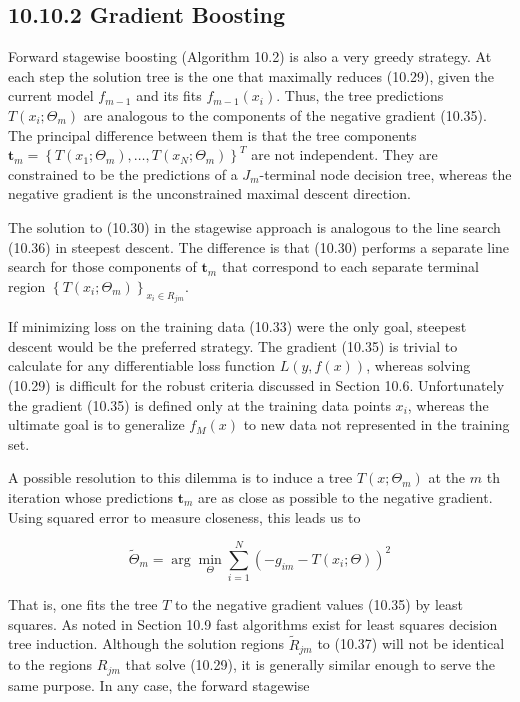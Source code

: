 \documentclass[10pt]{article}
\begin{document}
\subsection*{10.10.2 Gradient Boosting}
Forward stagewise boosting (Algorithm 10.2) is also a very greedy strategy. At each step the solution tree is the one that maximally reduces (10.29), given the current model $f_{m-1}$ and its fits $f_{m-1}\left(x_{i}\right)$. Thus, the tree predictions $T\left(x_{i} ; \Theta_{m}\right)$ are analogous to the components of the negative gradient (10.35). The principal difference between them is that the tree components $\mathbf{t}_{m}=\left\{T\left(x_{1} ; \Theta_{m}\right), \ldots, T\left(x_{N} ; \Theta_{m}\right)\right\}^{T}$ are not independent. They are constrained to be the predictions of a $J_{m}$-terminal node decision tree, whereas the negative gradient is the unconstrained maximal descent direction.

The solution to (10.30) in the stagewise approach is analogous to the line search (10.36) in steepest descent. The difference is that (10.30) performs a separate line search for those components of $\mathbf{t}_{m}$ that correspond to each separate terminal region $\left\{T\left(x_{i} ; \Theta_{m}\right)\right\}_{x_{i} \in R_{j m}}$.

If minimizing loss on the training data (10.33) were the only goal, steepest descent would be the preferred strategy. The gradient (10.35) is trivial to calculate for any differentiable loss function $L(y, f(x))$, whereas solving (10.29) is difficult for the robust criteria discussed in Section 10.6. Unfortunately the gradient (10.35) is defined only at the training data points $x_{i}$, whereas the ultimate goal is to generalize $f_{M}(x)$ to new data not represented in the training set.

A possible resolution to this dilemma is to induce a tree $T\left(x ; \Theta_{m}\right)$ at the $m$ th iteration whose predictions $\mathbf{t}_{m}$ are as close as possible to the negative gradient. Using squared error to measure closeness, this leads us to


\begin{equation*}
\tilde{\Theta}_{m}=\arg \min _{\Theta} \sum_{i=1}^{N}\left(-g_{i m}-T\left(x_{i} ; \Theta\right)\right)^{2} \tag{10.37}
\end{equation*}


That is, one fits the tree $T$ to the negative gradient values (10.35) by least squares. As noted in Section 10.9 fast algorithms exist for least squares decision tree induction. Although the solution regions $\tilde{R}_{j m}$ to (10.37) will not be identical to the regions $R_{j m}$ that solve (10.29), it is generally similar enough to serve the same purpose. In any case, the forward stagewise
\end{document}
